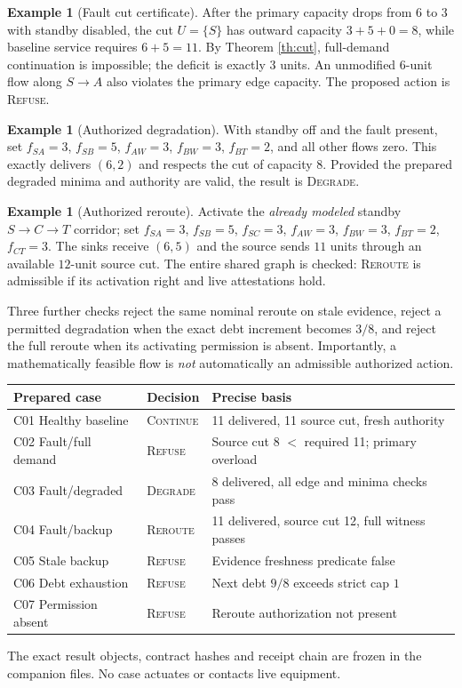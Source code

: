 \documentclass[11pt,letterpaper]{article}
\theoremstyle{definition}\newtheorem{definition}[theorem]{Definition}\newtheorem{example}[theorem]{Example}
\theoremstyle{remark}\newtheorem{remark}[theorem]{Remark}
\begin{document}
\begin{example}[Fault cut certificate]
After the primary capacity drops from $6$ to $3$ with standby disabled, the cut $U=\{S\}$ has outward capacity $3+5+0=8$, while baseline service requires $6+5=11$. By Theorem \ref{th:cut}, full-demand continuation is impossible; the deficit is exactly $3$ units. An unmodified $6$-unit flow along $S\to A$ also violates the primary edge capacity. The proposed action is \textsc{Refuse}.
\end{example}
\begin{example}[Authorized degradation]
With standby off and the fault present, set $f_{SA}=3$, $f_{SB}=5$, $f_{AW}=3$, $f_{BW}=3$, $f_{BT}=2$, and all other flows zero. This exactly delivers $(6,2)$ and respects the cut of capacity $8$. Provided the prepared degraded minima and authority are valid, the result is \textsc{Degrade}.
\end{example}
\begin{example}[Authorized reroute]
Activate the \emph{already modeled} standby $S\to C\to T$ corridor; set $f_{SA}=3$, $f_{SB}=5$, $f_{SC}=3$, $f_{AW}=3$, $f_{BW}=3$, $f_{BT}=2$, $f_{CT}=3$. The sinks receive $(6,5)$ and the source sends $11$ units through an available $12$-unit source cut. The entire shared graph is checked: \textsc{Reroute} is admissible if its activation right and live attestations hold.
\end{example}
Three further checks reject the same nominal reroute on stale evidence, reject a permitted degradation when the exact debt increment becomes $3/8$, and reject the full reroute when its activating permission is absent. Importantly, a mathematically feasible flow is \emph{not} automatically an admissible authorized action.

\begin{center}\small
\begin{tabular}{@{}p{.31\linewidth}p{.18\linewidth}p{.41\linewidth}@{}}\toprule
Prepared case & Decision & Precise basis\\\midrule
C01 Healthy baseline & \textsc{Continue} & 11 delivered, 11 source cut, fresh authority\\
C02 Fault/full demand & \textsc{Refuse} & Source cut 8 $<$ required 11; primary overload\\
C03 Fault/degraded & \textsc{Degrade} & 8 delivered, all edge and minima checks pass\\
C04 Fault/backup & \textsc{Reroute} & 11 delivered, source cut 12, full witness passes\\
C05 Stale backup & \textsc{Refuse} & Evidence freshness predicate false\\
C06 Debt exhaustion & \textsc{Refuse} & Next debt $9/8$ exceeds strict cap $1$\\
C07 Permission absent & \textsc{Refuse} & Reroute authorization not present\\\bottomrule
\end{tabular}
\end{center}
The exact result objects, contract hashes and receipt chain are frozen in the companion files. No case actuates or contacts live equipment.
\end{document}
